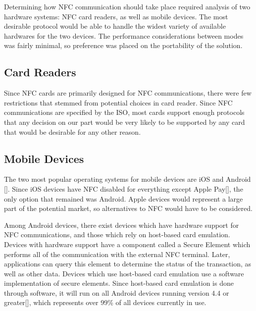 \documentclass[12pt]{report}
\begin{document}
Determining how NFC communication should take place required analysis of two hardware systems: NFC card readers, as well
as mobile devices. The most desirable protocol would be able to handle the widest variety of available hardwares for
the two devices. The performance considerations between modes was fairly minimal, so preference was placed on the
portability of the solution.


\subsection{Card Readers}

Since NFC cards are primarily designed for NFC communications, there were few restrictions that stemmed from potential
choices in card reader. Since NFC communications are specified by the ISO, most cards support enough protocols that any
decision on our part would be very likely to be supported by any card that would be desirable for any other reason.


\subsection{Mobile Devices}

The two most popular operating systems for mobile devices are iOS and Android []. Since iOS devices have NFC disabled
for everything except Apple Pay[], the only option that remained was Android. Apple devices would represent a large
part of the potential market, so alternatives to NFC would have to be considered.

Among Android devices, there exist devices which have hardware support for NFC communications, and those which rely on
host-based card emulation. Devices with hardware support have a component called a Secure Element which performs all of
the communication with the external NFC terminal. Later, applications can query this element to determine the status of
the transaction, as well as other data. Devices which use host-based card emulation use a software implementation of
secure elements. Since host-based card emulation is done through software, it will run on all Android devices running
version 4.4 or greater[], which represents over 99\% of all devices currently in use.
\end{document}
